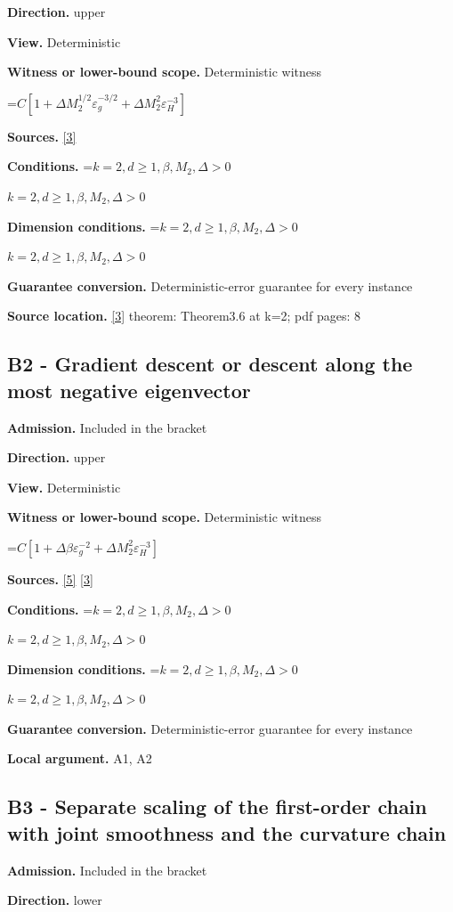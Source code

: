 \documentclass[10pt,a4paper]{article}
\newcommand{\AtlasMath}[1]{\par\begingroup\centering\setbox0=\hbox{$\displaystyle #1$}\ifdim\wd0>1.4\linewidth\typeout{ATLAS WIDE FORMULA: \the\wd0}\fi\ifdim\wd0>\linewidth\resizebox{\linewidth}{!}{\box0}\else\box0\fi\par\endgroup}
\newcommand{\AtlasInlineMath}[1]{\begingroup\setbox0=\hbox{$#1$}\ifdim\wd0>.4\linewidth\endgroup\AtlasMath{#1}\else\endgroup$#1$\fi}
\begin{document}
\textbf{Direction.} upper

\textbf{View.} Deterministic

\textbf{Witness or lower-bound scope.} Deterministic witness

\AtlasMath{C[1+\Delta M_2^{1/2}\varepsilon_g^{-3/2}+\Delta M_2^2\varepsilon_H^{-3}]}
\textbf{Sources.} \href{https://arxiv.org/abs/1708.04044}{[3]}

\textbf{Conditions.} \AtlasInlineMath{k=2,d\ge 1,\beta,M_2,\Delta>0}

\textbf{Dimension conditions.} \AtlasInlineMath{k=2,d\ge 1,\beta,M_2,\Delta>0}

\textbf{Guarantee conversion.} Deterministic-error guarantee for every instance

\textbf{Source location.} \href{https://arxiv.org/abs/1708.04044}{[3]} theorem: Theorem3.6 at k=2; pdf pages: 8

\subsection{B2 - Gradient descent or descent along the most negative eigenvector}
\textbf{Admission.} Included in the bracket

\textbf{Direction.} upper

\textbf{View.} Deterministic

\textbf{Witness or lower-bound scope.} Deterministic witness

\AtlasMath{C[1+\Delta\beta\varepsilon_g^{-2}+\Delta M_2^2\varepsilon_H^{-3}]}
\textbf{Sources.} \href{https://optimization-online.org/wp-content/uploads/2015/06/4970.pdf}{[5]} \href{https://arxiv.org/abs/1708.04044}{[3]}

\textbf{Conditions.} \AtlasInlineMath{k=2,d\ge 1,\beta,M_2,\Delta>0}

\textbf{Dimension conditions.} \AtlasInlineMath{k=2,d\ge 1,\beta,M_2,\Delta>0}

\textbf{Guarantee conversion.} Deterministic-error guarantee for every instance

\textbf{Local argument.} A1, A2

\subsection{B3 - Separate scaling of the first-order chain with joint smoothness and the curvature chain}
\textbf{Admission.} Included in the bracket

\textbf{Direction.} lower
\end{document}
